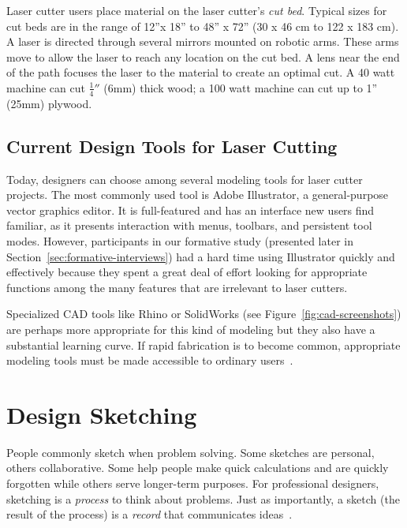 Laser cutter users place material on the laser cutter's \textit{cut
  bed}. Typical sizes for cut beds are in the range of 12''x 18'' to
48'' x 72'' (30 x 46 cm to 122 x 183 cm). A laser is directed through
several mirrors mounted on robotic arms. These arms move to allow the
laser to reach any location on the cut bed. A lens near the end of the
path focuses the laser to the material to create an optimal cut. A 40
watt machine can cut $\frac{1}{4}''$ (6mm) thick wood; a 100 watt
machine can cut up to 1'' (25mm) plywood.

\subsection{Current Design Tools for Laser Cutting}

Today, designers can choose among several modeling tools for laser
cutter projects. The most commonly used tool is Adobe Illustrator, a
general-purpose vector graphics editor. It is full-featured and has an
interface new users find familiar, as it presents interaction with
menus, toolbars, and persistent tool modes. However, participants in
our formative study (presented later in
Section~\ref{sec:formative-interviews}) had a hard time using
Illustrator quickly and effectively because they spent a great deal of
effort looking for appropriate functions among the many features that
are irrelevant to laser cutters. 

Specialized CAD tools like Rhino or SolidWorks (see
Figure~\ref{fig:cad-screenshots}) are perhaps more appropriate for
this kind of modeling but they also have a substantial learning
curve. If rapid fabrication is to become common, appropriate modeling
tools must be made accessible to ordinary
users~\cite{lipson-homefactory}.



\section{Design Sketching}

People commonly sketch when problem solving. Some sketches are
personal, others collaborative. Some help people make quick
calculations and are quickly forgotten while others serve longer-term
purposes. For professional designers, sketching is a \textit{process}
to think about problems. Just as importantly, a sketch (the result of
the process) is a \textit{record} that communicates
ideas~\cite{ferguson-engineering}.

